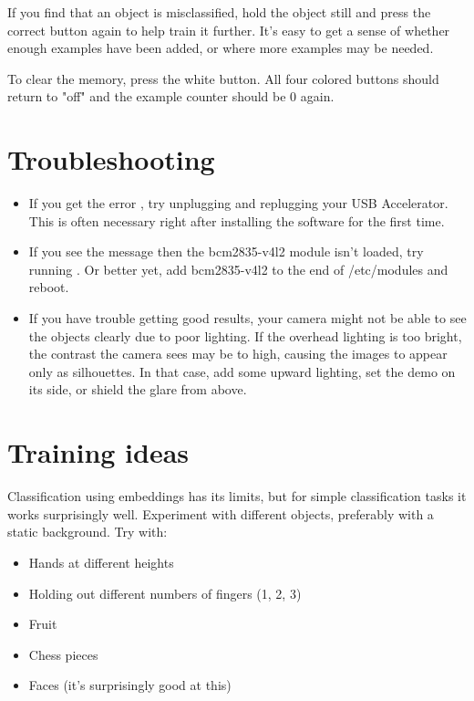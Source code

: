 \begin{enumerate}
	\medskip
	
	If you find that an object is misclassified, hold the object still and press the correct button again to help train it further. It's easy to get a sense of whether enough examples have been added, or where more examples may be needed.
	
	\medskip
	
	To clear the memory, press the white button. All four colored buttons should return to "off" and the example counter should be 0 again.
\end{enumerate}


\section{Troubleshooting}

\begin{itemize}
	\item If you get the error , try unplugging and replugging your USB Accelerator. This is often necessary right after installing the software for the first time.
	
	\item If you see the message  then the bcm2835-v4l2 module isn't loaded, try running . Or better yet, add bcm2835-v4l2 to the end of /etc/modules and reboot.
	
	\item If you have trouble getting good results, your camera might not be able to see the objects clearly due to poor lighting. If the overhead lighting is too bright, the contrast the camera sees may be to high, causing the images to appear only as silhouettes. In that case, add some upward lighting, set the demo on its side, or shield the glare from above.
\end{itemize}


\section{Training ideas}

Classification using embeddings has its limits, but for simple classification tasks it works surprisingly well. Experiment with different objects, preferably with a static background. Try with:

\begin{itemize}
	\item Hands at different heights
	
	\item Holding out different numbers of fingers (1, 2, 3)
	
	\item Fruit
	
	\item Chess pieces
	
	\item Faces (it's surprisingly good at this)
\end{itemize}



